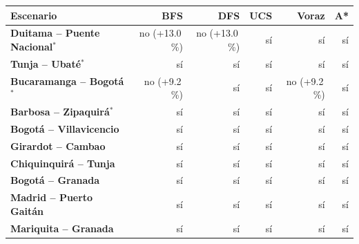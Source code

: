 \renewcommand{\arraystretch}{1.2}
\begin{tabular}{|l|r|r|r|r|r|}
\hline
\rowcolor{gray!20} \textbf{Escenario} & \textbf{BFS} & \textbf{DFS} & \textbf{UCS} & \textbf{Voraz} & \textbf{A*} \\
\hline
\textbf{Duitama -- Puente Nacional$^{*}$} & no (+13.0\,\%) & no (+13.0\,\%) & sí & sí & sí \\
\hline
\textbf{Tunja -- Ubaté$^{*}$} & sí & sí & sí & sí & sí \\
\hline
\textbf{Bucaramanga -- Bogotá$^{*}$} & no (+9.2\,\%) & sí & sí & no (+9.2\,\%) & sí \\
\hline
\textbf{Barbosa -- Zipaquirá$^{*}$} & sí & sí & sí & sí & sí \\
\hline
\textbf{Bogotá -- Villavicencio} & sí & sí & sí & sí & sí \\
\hline
\textbf{Girardot -- Cambao} & sí & sí & sí & sí & sí \\
\hline
\textbf{Chiquinquirá -- Tunja} & sí & sí & sí & sí & sí \\
\hline
\textbf{Bogotá -- Granada} & sí & sí & sí & sí & sí \\
\hline
\textbf{Madrid -- Puerto Gaitán} & sí & sí & sí & sí & sí \\
\hline
\textbf{Mariquita -- Granada} & sí & sí & sí & sí & sí \\
\hline
\end{tabular}
